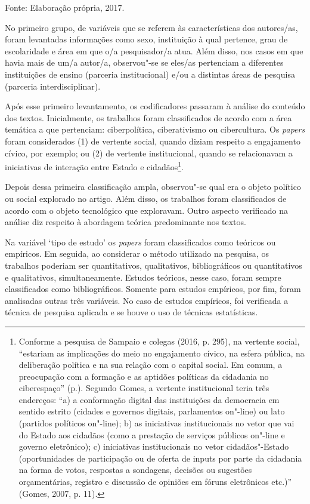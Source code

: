Fonte: Elaboração própria, 2017.

No primeiro grupo, de variáveis que se referem às características dos
autores/as, foram levantadas informações como sexo, instituição à qual
pertence, grau de escolaridade e área em que o/a pesquisador/a atua.
Além disso, nos casos em que havia mais de um/a autor/a, observou"-se se
eles/as pertenciam a diferentes instituições de ensino (parceria
institucional) e/ou a distintas áreas de pesquisa (parceria
interdisciplinar).

Após esse primeiro levantamento, os codificadores passaram à análise do
conteúdo dos textos. Inicialmente, os trabalhos foram classificados de
acordo com a área temática a que pertenciam: ciberpolítica,
ciberativismo ou cibercultura. Os \emph{papers} foram considerados (1)
de vertente social, quando diziam respeito a engajamento cívico, por
exemplo; ou (2) de vertente institucional, quando se relacionavam a
iniciativas de interação entre Estado e cidadãos\footnote{Conforme a
  pesquisa de Sampaio e colegas (2016, p. 295), na vertente social,
  ``estariam as implicações do meio no engajamento cívico, na esfera
  pública, na deliberação política e na sua relação com o capital
  social. Em comum, a preocupação com a formação e as aptidões políticas
  da cidadania no ciberespaço'' (p.). Segundo Gomes, a vertente
  institucional teria três endereços: ``a) a conformação digital das
  instituições da democracia em sentido estrito (cidades e governos
  digitais, parlamentos on"-line) ou lato (partidos políticos on"-line);
  b) as iniciativas institucionais no vetor que vai do Estado aos
  cidadãos (como a prestação de serviços públicos on"-line e governo
  eletrônico); c) iniciativas institucionais no vetor cidadãos"-Estado
  (oportunidades de participação ou de oferta de inputs por parte da
  cidadania na forma de votos, respostas a sondagens, decisões ou
  sugestões orçamentárias, registro e discussão de opiniões em fóruns
  eletrônicos etc.)'' (Gomes, 2007, p. 11).}.

Depois dessa primeira classificação ampla, observou"-se qual era o objeto
político ou social explorado no artigo. Além disso, os trabalhos foram
classificados de acordo com o objeto tecnológico que exploravam. Outro
aspecto verificado na análise diz respeito à abordagem teórica
predominante nos textos.

Na variável `tipo de estudo' os \emph{papers} foram classificados como
teóricos ou empíricos. Em seguida, ao considerar o método utilizado na
pesquisa, os trabalhos poderiam ser quantitativos, qualitativos,
bibliográficos ou quantitativos e qualitativos, simultaneamente. Estudos
teóricos, nesse caso, foram sempre classificados como bibliográficos.
Somente para estudos empíricos, por fim, foram analisadas outras três
variáveis. No caso de estudos empíricos, foi verificada a técnica de
pesquisa aplicada e se houve o uso de técnicas estatísticas.

